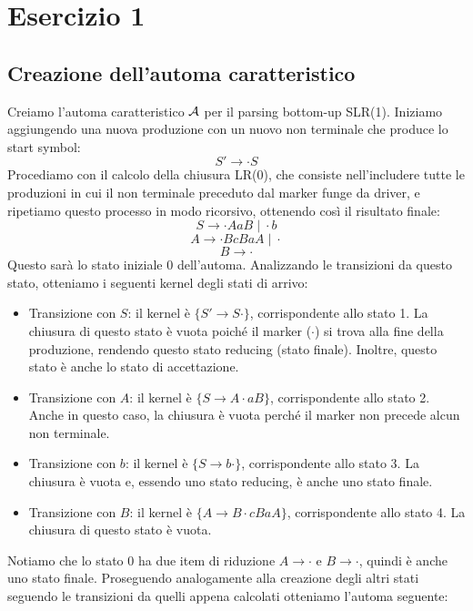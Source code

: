 \documentclass[11pt]{article}
\begin{document}
\section{Esercizio 1}

\subsection{Creazione dell'automa caratteristico}
Creiamo l'automa caratteristico $\cal A$ per il parsing bottom-up SLR(1). Iniziamo aggiungendo 
una nuova produzione con un nuovo non terminale che produce lo start symbol: 
$$ S'\rightarrow \cdot S $$ 
Procediamo con il calcolo della chiusura LR(0), che consiste nell'includere 
tutte le produzioni in cui il non terminale preceduto dal marker funge da 
driver, e ripetiamo questo processo in modo ricorsivo, ottenendo così il 
risultato finale:
$$ S \rightarrow \cdot AaB\;|\;\cdot b $$
$$ A \rightarrow \cdot BcBaA \; | \; \cdot $$
$$ B \rightarrow \cdot $$
Questo sarà lo stato iniziale 0 dell'automa. Analizzando le transizioni da 
questo stato, otteniamo i seguenti kernel degli stati di arrivo:

\begin{itemize}
  \item Transizione con $S$: il kernel è $\{ S' \rightarrow S \cdot \}$, corrispondente allo stato 1. 
  La chiusura di questo stato è vuota poiché il marker ($\cdot$) si trova alla fine della produzione, 
  rendendo questo stato reducing (stato finale). Inoltre, questo stato è anche lo stato di accettazione.
  
  \item Transizione con $A$: il kernel è $\{ S \rightarrow A \cdot aB \}$, corrispondente allo stato 2. 
  Anche in questo caso, la chiusura è vuota perché il marker non precede alcun non terminale.
  
  \item Transizione con $b$: il kernel è $\{ S \rightarrow b \cdot \}$, corrispondente allo stato 3. 
  La chiusura è vuota e, essendo uno stato reducing, è anche uno stato finale.
  
  \item Transizione con $B$: il kernel è $\{ A \rightarrow B \cdot cBaA \}$, corrispondente allo stato 4.
  La chiusura di questo stato è vuota.
\end{itemize}

\noindent Notiamo che lo stato 0 ha due item di riduzione $A \rightarrow \cdot$ e $B \rightarrow \cdot$, 
quindi è anche uno stato finale. Proseguendo analogamente alla creazione degli altri stati seguendo le 
transizioni da quelli appena calcolati otteniamo l'automa seguente:
\end{document}
